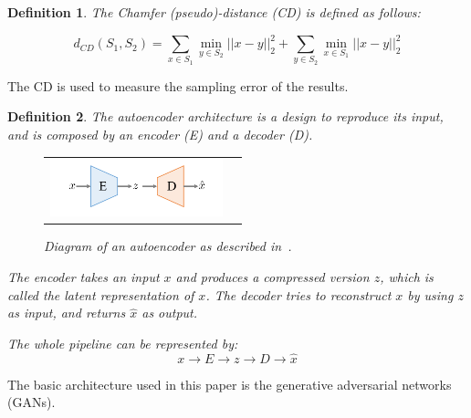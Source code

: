 \documentclass[12pt]{article}
\newtheorem{definition}{Definition}
\begin{document}
    \begin{definition}
        \normalfont
        The \emph{Chamfer (pseudo)-distance (CD)} is defined as follows:

        \[d_{CD}(S_{1}, S_{2}) = \sum_{x \in S_{1}} \min _{y \in S_{2}} || x - y||_{2}^{2} +
        \sum_{y \in S_{2}} \min_{x \in S_{1}} ||x - y||_{2}^{2}\]
    \end{definition}


    The CD is used to measure the sampling error of the results.

    \begin{definition}
        \normalfont
        The \emph{autoencoder} architecture is a design to reproduce its input, and is composed by an \emph{encoder} (E) and a \emph{decoder} (D).


        \begin{figure}[H]
            \centering
            \begin{tabular}{cc}
                \includegraphics[width = 50mm]{autoencoder}
            \end{tabular}
            \caption{Diagram of an autoencoder as described in~\cite{pmlr-v80-achlioptas18a}.}
        \end{figure}

        The encoder takes an input $x$ and produces a compressed version $z$, which is called the \emph{latent representation} of $x$. The decoder tries to reconstruct $x$ by using $z$ as input, and returns $\hat{x}$ as output.

        The whole pipeline can be represented by:
        \[x \to E \to z \to D \to \hat{x}\]
    \end{definition}

    The basic architecture used in this paper is the generative adversarial networks (GANs).
\end{document}
